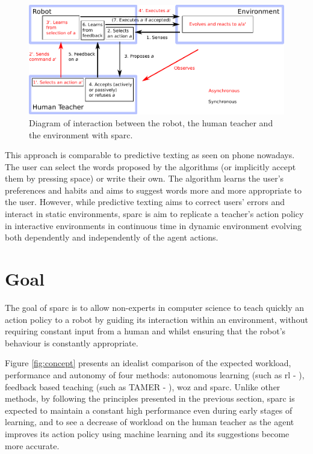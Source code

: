 \begin{figure}[ht]
	\includegraphics[width=1\linewidth]{diagram.pdf}
	\centering
	\caption{Diagram of interaction between the robot, the human teacher and the environment with \gls{sparc}.}
	\label{fig:sparc_diagram}
\end{figure}

This approach is comparable to predictive texting as seen on phone nowadays. The user can select the words proposed by the algorithms (or implicitly accept them by pressing space) or write their own. The algorithm learns the user's preferences and habits and aims to suggest words more and more appropriate to the user. However, while predictive texting aims to correct users' errors and interact in static environments, \gls{sparc} is aim to replicate a teacher's action policy in interactive environments in continuous time in dynamic environment evolving both dependently and independently of the agent actions.

\section{Goal}

The goal of \gls{sparc} is to allow non-experts in computer science to teach quickly an action policy to a robot by guiding its interaction within an environment, without requiring constant input from a human and whilst ensuring that the robot's behaviour is constantly appropriate. 

Figure \ref{fig:concept} presents an idealist comparison of the expected workload, performance and autonomy of four methods: autonomous learning (such as \gls{rl} - \citealt{sutton1998reinforcement}), feedback based teaching (such as TAMER - \citealt{knox2009interactively}), \gls{woz} and \gls{sparc}. Unlike other methods, by following the principles presented in the previous section, \gls{sparc} is expected to maintain a constant high performance even during early stages of learning, and to see a decrease of workload on the human teacher as the agent improves its action policy using machine learning and its suggestions become more accurate.

